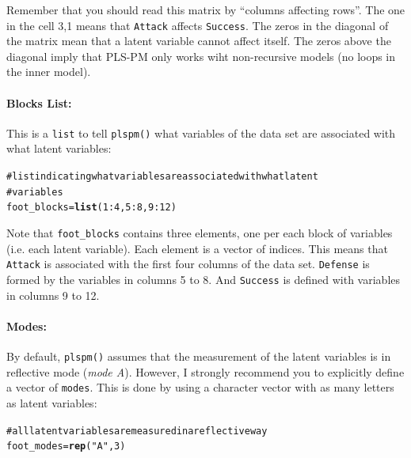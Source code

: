 \documentclass[12pt]{book}\usepackage{graphicx, color}
\makeatletter
\newcommand{\hlfunctioncall}[1]{\textcolor[rgb]{0.501960784313725,0,0.329411764705882}{\textbf{#1}}}%
\newcommand{\hlstring}[1]{\textcolor[rgb]{0.6,0.6,1}{#1}}%
\newcommand{\hlcomment}[1]{\textcolor[rgb]{0.180392156862745,0.6,0.341176470588235}{#1}}%
\newenvironment{kframe}{%
 \def\at@end@of@kframe{}%
 \ifinner\ifhmode%
  \def\at@end@of@kframe{\end{minipage}}%
  \begin{minipage}{\columnwidth}%
 \fi\fi%
 \def\FrameCommand##1{\hskip\@totalleftmargin \hskip-\fboxsep
 \colorbox{shadecolor}{##1}\hskip-\fboxsep
     \hskip-\linewidth \hskip-\@totalleftmargin \hskip\columnwidth}%
 \MakeFramed {\advance\hsize-\width
   \@totalleftmargin\z@ \linewidth\hsize
   \@setminipage}}%
 {\par\unskip\endMakeFramed%
 \at@end@of@kframe}
\newenvironment{knitrout}{}{} %
\newcommand{\fplspm}{\texttt{plspm()}}
\newcommand{\code}[1]{\texttt{#1}}
\makeatother
\begin{document}
Remember that you should read this matrix by ``columns affecting rows''. The one in the cell 3,1 means that \code{Attack} affects \code{Success}. The zeros in the diagonal of the matrix mean that a latent variable cannot affect itself. The zeros above the diagonal imply that PLS-PM only works wiht non-recursive models (no loops in the inner model).

\paragraph{Blocks List:}
This is a \code{list} to tell \fplspm{} what variables of the data set are associated with what latent variables:
\begin{knitrout}
\color{fgcolor}\begin{kframe}
\begin{alltt}
\hlcomment{# list indicating what variables are associated with what latent}
\hlcomment{# variables}
foot_blocks = \hlfunctioncall{list}(1:4, 5:8, 9:12)
\end{alltt}
\end{kframe}
\end{knitrout}

Note that \code{foot\_blocks} contains three elements, one per each block of variables (i.e. each latent variable). Each element is a vector of indices. This means that \texttt{Attack} is associated with the first four columns of the data set. \texttt{Defense} is formed by the variables in columns 5 to 8. And \code{Success} is defined with variables in columns 9 to 12.


\paragraph{Modes:} 
By default, \fplspm{} assumes that the measurement of the latent variables is in reflective mode (\textit{mode A}). However, I strongly recommend you to explicitly define a vector of \code{modes}. This is done by using a character vector with as many letters as latent variables:
\begin{knitrout}
\color{fgcolor}\begin{kframe}
\begin{alltt}
\hlcomment{# all latent variables are measured in a reflective way}
foot_modes = \hlfunctioncall{rep}(\hlstring{"A"}, 3)
\end{alltt}
\end{kframe}
\end{knitrout}
\end{document}
